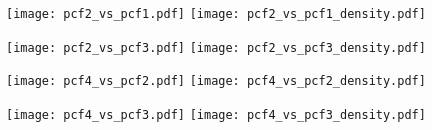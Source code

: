 \documentclass[11pt, oneside]{article}   	%
\begin{document}
\begin{figure}[htbp] %
   \centering
   \texttt{[image: pcf2\_vs\_pcf1.pdf]} 
   \texttt{[image: pcf2\_vs\_pcf1\_density.pdf]} 
   \caption{}
   \label{fig:example}
\end{figure}

\begin{figure}[htbp] %
   \centering
   \texttt{[image: pcf2\_vs\_pcf3.pdf]} 
   \texttt{[image: pcf2\_vs\_pcf3\_density.pdf]} 
   \caption{}
   \label{fig:example}
\end{figure}

\begin{figure}[htbp] %
   \centering
   \texttt{[image: pcf4\_vs\_pcf2.pdf]} 
   \texttt{[image: pcf4\_vs\_pcf2\_density.pdf]} 
   \caption{}
   \label{fig:example}
\end{figure}

\begin{figure}[htbp] %
   \centering
   \texttt{[image: pcf4\_vs\_pcf3.pdf]} 
   \texttt{[image: pcf4\_vs\_pcf3\_density.pdf]} 
   \caption{}
   \label{fig:example}
\end{figure}
\end{document}
